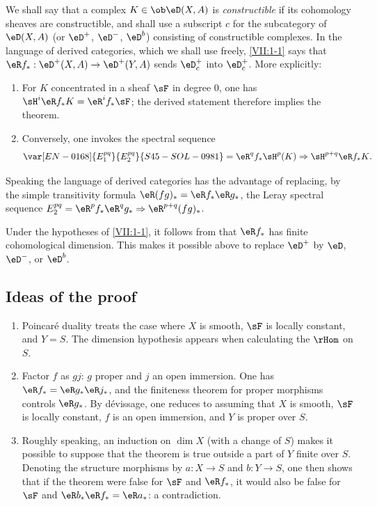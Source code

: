 We shall say that a complex $K\in\ob\eD(X,A)$ is \emph{constructible} if its
cohomology sheaves are constructible, and shall use a subscript $c$ for the
subcategory of $\eD(X,A)$ (or $\eD^+$, $\eD^-$, $\eD^b$) consisting of
constructible complexes. In the language of derived categories, which we
shall use freely, \ref{VII:1-1} says that
$\eR f_\ast:\eD^+(X,A) \to \eD^+(Y,A)$ sends $\eD_c^+$ into $\eD_c^+$.
More explicitly:
\begin{enumerate}[\indent a)]
  \item For $K$ concentrated in a sheaf $\sF$ in degree $0$, one has
    $\sH^i\eR f_\ast K = \eR^i f_\ast \sF$; the derived statement therefore
    implies the theorem.
  \item Conversely, one invokes the spectral sequence
    \[
      \var[EN-0168]{E_1^{p q}}{E_2^{p q}}{S45-SOL-0981} = \eR^q f_\ast \sH^p(K) \Rightarrow \sH^{p+q} \eR f_\ast K \text{.}
    \]
\end{enumerate}

Speaking the language of derived categories has the advantage of replacing,
by the simple transitivity formula $\eR(f g)_\ast = \eR f_\ast \eR g_\ast$,
the Leray spectral sequence
$E_2^{p q} = \eR^p f_\ast \eR^q g_\ast \Rightarrow \eR^{p+q} (f g)_\ast$.

Under the hypotheses of \ref{VII:1-1}, it follows from  that
$\eR f_\ast$ has finite cohomological dimension. This makes it possible above
to replace $\eD^+$ by $\eD$, $\eD^-$, or $\eD^b$.






\subsection{Ideas of the proof}\label{VII:1-4}
\begin{enumerate}[\indent a)]
  \item Poincaré duality treats the case where $X$ is smooth, $\sF$ is
    locally constant, and $Y=S$. The dimension hypothesis appears when calculating the $\rHom$ on $S$.
  \item Factor $f$ as $g j$: $g$ proper and $j$ an open immersion. One has
    $\eR f_\ast = \eR g_\ast \eR j_\ast$, and the finiteness theorem for
    proper morphisms controls $\eR g_\ast$. By dévissage, one reduces to
    assuming that $X$ is smooth, $\sF$ is locally constant, $f$ is an open
    immersion, and $Y$ is proper over $S$.
  \item Roughly speaking, an induction on $\dim X$ (with a change of $S$) makes it
    possible to suppose that the theorem is true outside a part of $Y$ finite
    over $S$. Denoting the structure morphisms by $a:X\to S$ and $b:Y\to S$,
    one then shows that if the theorem were false for $\sF$ and
    $\eR f_\ast$, it would also be false for $\sF$ and
    $\eR b_\ast \eR f_\ast = \eR a_\ast$: a contradiction.
\end{enumerate}






